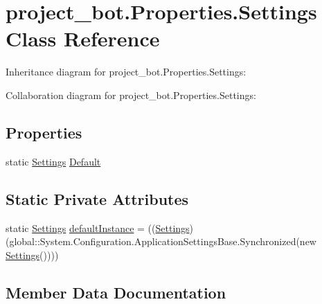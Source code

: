 \hypertarget{classproject__bot_1_1_properties_1_1_settings}{}\section{project\+\_\+bot.\+Properties.\+Settings Class Reference}
\label{classproject__bot_1_1_properties_1_1_settings}


Inheritance diagram for project\+\_\+bot.\+Properties.\+Settings\+:


Collaboration diagram for project\+\_\+bot.\+Properties.\+Settings\+:
\subsection*{Properties}
\begin{DoxyCompactItemize}
\item 
static \hyperlink{classproject__bot_1_1_properties_1_1_settings}{Settings} \hyperlink{classproject__bot_1_1_properties_1_1_settings_a1858ac8deefc455ffb3d6f8967420641}{Default}
\end{DoxyCompactItemize}
\subsection*{Static Private Attributes}
\begin{DoxyCompactItemize}
\item 
static \hyperlink{classproject__bot_1_1_properties_1_1_settings}{Settings} \hyperlink{classproject__bot_1_1_properties_1_1_settings_afc4b6f7d329338959907dd8aff4a5565}{default\+Instance} = ((\hyperlink{classproject__bot_1_1_properties_1_1_settings}{Settings})(global\+::\+System.\+Configuration.\+Application\+Settings\+Base.\+Synchronized(new \hyperlink{classproject__bot_1_1_properties_1_1_settings}{Settings}())))
\end{DoxyCompactItemize}


\subsection{Member Data Documentation}
\mbox{\label{classproject__bot_1_1_properties_1_1_settings_afc4b6f7d329338959907dd8aff4a5565}} 
